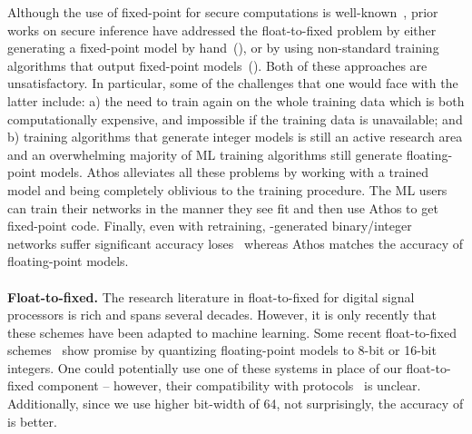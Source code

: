 Although the use of fixed-point for secure computations is well-known~\cite{valeriaRidge},
prior works on secure inference have addressed the float-to-fixed problem by either
generating a fixed-point model by hand~(\cite{secureml,minionn,gazelle,aby3,securenn,delphi,chameleon}),
or by using non-standard training algorithms that output fixed-point models~(\cite{xonn,nitin}).
Both of these approaches are unsatisfactory. In particular, 
some of the challenges that one would face with the latter include: a) the need to train again on the whole training data which is both computationally expensive, and impossible if the training data is unavailable; and
b)
training algorithms that generate integer models  is still an active research area and an overwhelming majority of ML training algorithms still generate floating-point models. 
Athos alleviates all these problems by working with a trained model and being completely oblivious to the training procedure.
The ML users can train their networks in the manner they see fit and then use Athos to get  fixed-point code.
Finally, even with retraining, \tensorflow-generated binary/integer networks suffer significant accuracy loses~\cite{tflite} whereas
Athos matches the accuracy of floating-point models.
\\\\
\noindent\textbf{Float-to-fixed.}
The research literature in float-to-fixed for digital signal processors is rich and spans several decades.
However, it is only recently that these schemes have been adapted to machine learning.
Some recent float-to-fixed schemes~\cite{seedot,qualcom,tflite} show promise by quantizing floating-point models to 8-bit or 16-bit integers. One could potentially use one of these systems in place of our float-to-fixed component -- however, their compatibility with \mpc protocols~\cite{aby3,securenn} is unclear. Additionally, since we use higher bit-width of 64, not surprisingly, the accuracy of \tool is better.  
